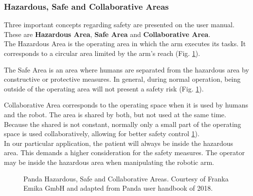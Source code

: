
\subsubsection*{Hazardous, Safe and Collaborative Areas}
\label{subsubsec:robotic_system_operation_safety_hazardous_safe_collaborative_areas}

Three important concepts regarding safety are presented on the user manual. These are \textbf{Hazardous Area}, \textbf{Safe Area} and \textbf{Collaborative Area}.\\

The Hazardous Area is the operating area in which the arm executes its tasks. It corresponds to a circular area limited by the arm's reach (Fig. \ref{fig:panda_hazardous_safe_collaborative_areas}).

The Safe Area is an area where humans are separated from the hazardous area by constructive or protective measures. In general, during normal operation, being outside of the operating area will not present a safety risk (Fig. \ref{fig:panda_hazardous_safe_collaborative_areas}).

Collaborative Area corresponds to the operating space when it is used by humans and the robot. The area is shared by both, but not used at the same time. Because the shared is not constant, normally only a small part of the operating space is used collaboratively, allowing for better safety control \ref{fig:panda_hazardous_safe_collaborative_areas}).\\

In our particular application, the patient will always be inside the hazardous area. This demands a higher consideration for the safety measures. The operator may be inside the hazardous area when manipulating the robotic arm.

\begin{figure}[htbp]
    \centering
	\hspace{0.1in}
	\caption{Panda Hazardous, Safe and Collaborative Areas. Courtesy of Franka Emika GmbH and adapted from Panda user handbook of 2018.}
	\label{fig:panda_hazardous_safe_collaborative_areas}
\end{figure}


